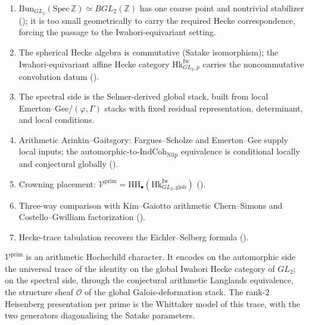 \begin{enumerate}
\item \(\mathrm{Bun}_{GL_{2}}(\mathrm{Spec}\,\mathbb{Z})\simeq BGL_{2}(\mathbb{Z})\)
has one coarse point and nontrivial stabilizer
(); it is too small
geometrically to carry the required Hecke correspondence, forcing the
passage to the Iwahori-equivariant setting.
\item The spherical Hecke algebra is commutative (Satake isomorphism); the Iwahori-equivariant
affine Hecke category \(\mathrm{Hk}^{\mathrm{Iw}}_{GL_{2},p}\) carries the noncommutative
convolution datum ().
\item The spectral side is the Selmer-derived global stack, built
from local Emerton--Gee/\((\varphi,\Gamma)\) stacks with fixed
residual representation, determinant, and local conditions.
\item Arithmetic Arinkin--Gaitsgory: Fargues--Scholze and Emerton--Gee supply local inputs;
the automorphic-to-\(\mathrm{IndCoh}_{\mathrm{Nilp}}\) equivalence is
conditional locally and conjectural globally
().
\item Crowning placement:
\(\mathcal{V}^{\mathrm{prim}}=\mathrm{HH}_{\bullet}(\mathrm{Hk}^{\mathrm{Iw}}_{GL_{2},\mathrm{glob}})\)
().
\item Three-way comparison with Kim--Gaiotto arithmetic Chern--Simons and Costello--Gwilliam
factorization ().
\item Hecke-trace tabulation recovers the Eichler--Selberg formula
().
\end{enumerate}

\(\mathcal{V}^{\mathrm{prim}}\) is an arithmetic Hochschild
character. It encodes on the automorphic side the universal trace
of the identity on the global Iwahori Hecke category of \(GL_{2}\);
on the spectral side, through the conjectural arithmetic Langlands
equivalence, the structure sheaf \(\mathcal{O}\) of the global
Galois-deformation stack. The rank-\(2\) Heisenberg presentation
per prime is the Whittaker model of this trace, with the two
generators diagonalising the Satake parameters.
